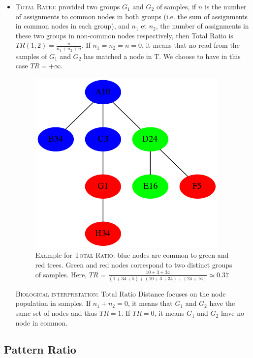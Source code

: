 \documentclass{report}
\begin{document}
\begin{itemize}
\item \textsc{Total Ratio:} provided two groups $G_{1}$ and $G_{2}$ of samples, if $n$ is the number of assignments to common nodes in both groups (i.e. the sum of assignments in common nodes in each group), and $n_{1}$ et $n_{2}$, the number of assignments in these two groups in non-common nodes respectively, then Total Ratio is $TR(1,2) = \frac{n}{n_{1} + n_{2} + n}$. If $n_{1} = n_{2} = n = 0$, it means that no read from the samples of $G_{1}$ and $G_{2}$ has matched a node in \textsc{T}. We choose to have in this case $TR = +\infty$.

\begin{figure}[H]
\centering
\includegraphics[scale=0.5]{illustrations/totalratio.png}
\caption{Example for \textsc{Total Ratio}: blue nodes are common to green and red trees. Green and red nodes correspond to two distinct groups of samples. Here, $TR$ = $\frac{10 + 3 + 34}{(1 + 34 + 5) + (10 + 3 + 34) + (24 + 16)} \simeq 0.37$}
\end{figure}

\bigskip

  \textsc{Biological interpretation:} Total Ratio Distance focuses on the node population in samples. If $n_{1} + n_{2} = 0$, it means that $G_{1}$ and $G_{2}$ have the same set of nodes and thus $TR = 1$. If $TR = 0$, it means $G_{1}$ and $G_{2}$ have no node in common.
\end{itemize}

\subsection{Pattern Ratio}
\end{document}

